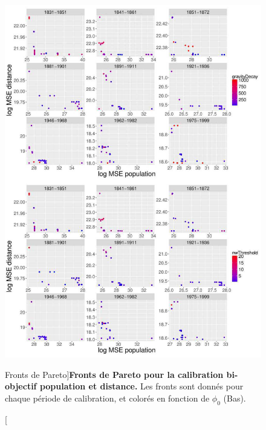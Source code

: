 \begin{figure}
	\includegraphics[width=\linewidth,height=0.9\textheight]{Figures/Final/6-2-3-fig-macrocoevol-pareto}
	\caption[Pareto fronts][Fronts de Pareto]{\label{fig:macrocoevol:pareto}}{\textbf{Fronts de Pareto pour la calibration bi-objectif population et distance.} Les fronts sont donnés pour chaque période de calibration, et colorés en fonction de $\phi_0$ (Bas).\label{fig:macrocoevol:pareto}}
\end{figure}


